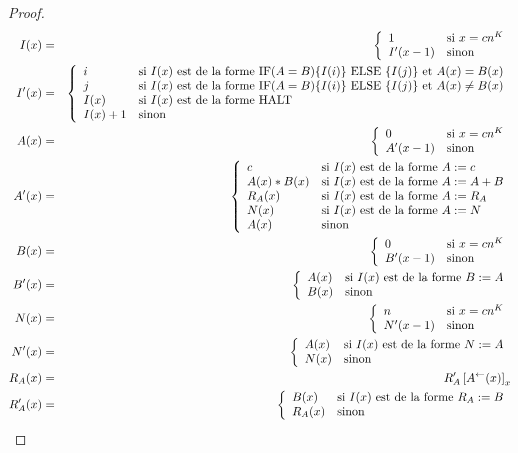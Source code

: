 \begin{proof}
{\begin{minipage}{0.9\textwidth}
				\setcounter{equation}{0}
				\begin{eqnarray}
					I(x) & = & \left\lbrace \begin{array}{ll} 
							1			& 	\text{si $x = c n^K$} \\
							I'(x-1)		& 	\text{sinon}
							 \end{array} \right. \\
					I'(x) & = & \left\lbrace \begin{array}{ll} 
							i			& 	\text{si $I(x)$ est de la forme $\text{IF} (A=B) \{I( i )\} \text{ ELSE } \{I( j )\}$ et $A(x) = B(x)$} \\
							j			& 	\text{si $I(x)$ est de la forme $\text{IF} (A=B) \{I( i )\} \text{ ELSE } \{I( j )\}$ et $A(x) \neq B(x)$} \\
							I(x)		&  	\text{si $I(x)$ est de la forme $\text{HALT}$} \\
							I(x) + 1 	& 	\text{sinon} 
							 \end{array} \right. \\
					A(x) & = & \left\lbrace \begin{array}{ll} 
							0			& 	\text{si $x = cn^K$} \\
							A'(x-1)		& 	\text{sinon}
							 \end{array} \right. \\
					A'(x) & = & \left\lbrace \begin{array}{ll} 
							c			& 	\text{si $I(x)$ est de la forme $A := c$} \\
							A(x) * B(x)	& 	\text{si $I(x)$ est de la forme $A := A + B$} \\
							R_A(x) 		& 	\text{si $I(x)$ est de la forme $A := R_A$} \\
							N(x)		& 	\text{si $I(x)$ est de la forme $A := N$} \\
							A(x)		& 	\text{sinon}
							 \end{array} \right. \\
					B(x) & = & \left\lbrace \begin{array}{ll} 
							0			& 	\text{si $x = cn^K$} \\
							B'(x-1)		& 	\text{sinon}
							 \end{array} \right. \\
					B'(x) & = & \left\lbrace \begin{array}{ll} 
							A(x)		& 	\text{si $I(x)$ est de la forme $B := A$} \\
							B(x)		& 	\text{sinon}
							 \end{array} \right. \\
					N(x) & = & \left\lbrace \begin{array}{ll} 
							n			& 	\text{si $x = cn^K$} \\
							N'(x-1)		& 	\text{sinon}
							 \end{array} \right. \\
					N'(x) & = & \left\lbrace \begin{array}{ll} 
							A(x)		& 	\text{si $I(x)$ est de la forme $N := A$} \\
							N(x)		& 	\text{sinon}
							 \end{array} \right. \\
					R_A(x) & = & R_A'\left[ A^{\leftarrow}(x) \right]_{x} \\
					R_A'(x) & = & \left\lbrace \begin{array}{ll} 
							B(x)		& 	\text{si $I(x)$ est de la forme $R_A := B$} \\
							R_A(x)		& 	\text{sinon}
							 \end{array} \right.
				\end{eqnarray}
			

\end{minipage}}
\end{proof}
